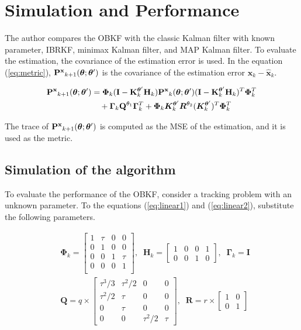 \section{Simulation and Performance}

The author compares the OBKF with the classic Kalman filter with known parameter, IBRKF, minimax Kalman filter, and MAP Kalman filter. To evaluate the estimation, the covariance of the estimation error is used. In the equation (\ref{eq:metric}), ${\bf P^x}_{k+1}(\bm{\theta};\bm{\theta}')$ is the covariance of the estimation error $\bm{x}_k-\bm{\hat x}_k$. 

\begin{align}\label{eq:metric}
{\bf P^x}_{k+1}(\bm{\theta};\bm{\theta}') &= \bm{\Phi}_k({\bf I}-{\bf K}^{\bm{\theta}'}_k{\bf H}_k){\bf P^x}_k(\bm{\theta};\bm{\theta}')({\bf I}-{\bf K}^{\bm{\theta}'}_k{\bf H}_k)^T\bm{\Phi}^T_k \nonumber \\
&\quad + \bm{\Gamma}_k{\bf Q}^{\theta_1}\bm{\Gamma}_k^T + \bm{\Phi}_k\bm{K}_k^{\bm{\theta}'}\bm{R}^{\theta_2}(\bm{K}_k^{\bm{\theta}'})^T\bm{\Phi}_k^T
\end{align}

The trace of ${\bf P^x}_{k+1}(\bm{\theta};\bm{\theta}')$ is computed as the MSE of the estimation, and it is used as the metric.

\subsection{Simulation of the algorithm}

To evaluate the performance of the OBKF, consider a tracking problem with an unknown parameter. To the equations (\ref{eq:linear1}) and (\ref{eq:linear2}), substitute the following parameters.

\begin{align*}
    &\bm{\Phi}_k=
    \begin{bmatrix}
        1 & \tau & 0 & 0\\
        0 & 1 & 0 & 0 \\
        0 & 0 & 1 & \tau \\
        0 & 0 & 0 & 1 \\
    \end{bmatrix}, \;\;
    \bm{H}_k = 
    \begin{bmatrix}
        1&0&0&1\\
        0&0&1&0
    \end{bmatrix}, \;\;
    \bm{\Gamma}_k = \bm{I} \\
    &\bm{Q} = q \times 
    \begin{bmatrix}
        \tau^3/3 & \tau^2/2 & 0 & 0 \\
        \tau^2/2 & \tau & 0 & 0 \\
        0 & \tau & 0 & 0 \\
        0 & 0 & \tau^2/2 & \tau
    \end{bmatrix}, \;\;
    \bm{R}=r\times\begin{bmatrix}
        1&0\\
        0&1
    \end{bmatrix}
\end{align*}

